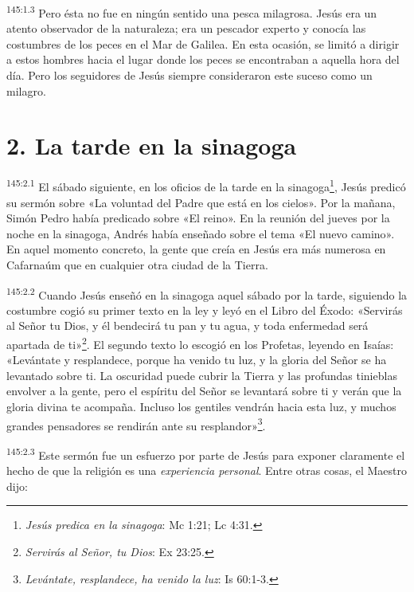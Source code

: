 \par 
\textsuperscript{145:1.3} Pero ésta no fue en ningún sentido una pesca milagrosa. Jesús era un atento observador de la naturaleza; era un pescador experto y conocía las costumbres de los peces en el Mar de Galilea. En esta ocasión, se limitó a dirigir a estos hombres hacia el lugar donde los peces se encontraban a aquella hora del día. Pero los seguidores de Jesús siempre consideraron este suceso como un milagro.

\section*{2. La tarde en la sinagoga}
\par 
\textsuperscript{145:2.1} El sábado siguiente, en los oficios de la tarde en la sinagoga\footnote{\textit{Jesús predica en la sinagoga}: Mc 1:21; Lc 4:31.}, Jesús predicó su sermón sobre «La voluntad del Padre que está en los cielos». Por la mañana, Simón Pedro había predicado sobre «El reino». En la reunión del jueves por la noche en la sinagoga, Andrés había enseñado sobre el tema «El nuevo camino». En aquel momento concreto, la gente que creía en Jesús era más numerosa en Cafarnaúm que en cualquier otra ciudad de la Tierra.

\par 
\textsuperscript{145:2.2} Cuando Jesús enseñó en la sinagoga aquel sábado por la tarde, siguiendo la costumbre cogió su primer texto en la ley y leyó en el Libro del Éxodo: «Servirás al Señor tu Dios, y él bendecirá tu pan y tu agua, y toda enfermedad será apartada de ti»\footnote{\textit{Servirás al Señor, tu Dios}: Ex 23:25.}. El segundo texto lo escogió en los Profetas, leyendo en Isaías: «Levántate y resplandece, porque ha venido tu luz, y la gloria del Señor se ha levantado sobre ti. La oscuridad puede cubrir la Tierra y las profundas tinieblas envolver a la gente, pero el espíritu del Señor se levantará sobre ti y verán que la gloria divina te acompaña. Incluso los gentiles vendrán hacia esta luz, y muchos grandes pensadores se rendirán ante su resplandor»\footnote{\textit{Levántate, resplandece, ha venido la luz}: Is 60:1-3.}.

\par 
\textsuperscript{145:2.3} Este sermón fue un esfuerzo por parte de Jesús para exponer claramente el hecho de que la religión es una \textit{experiencia personal}. Entre otras cosas, el Maestro dijo:

